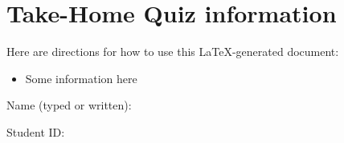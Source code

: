 \vspace*{-2em}
\section*{Take-Home Quiz information}
Here are directions for how to use this LaTeX-generated document:
\vspace*{-1em}
\begin{itemize}[itemsep=0pt]
\item Some information here
\end{itemize}

\vspace*{1em}

\vspace*{1.5em}
Name (typed or written): \blank{} %

\vspace*{1.5em}
Student ID: \blank{} %

